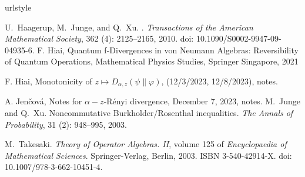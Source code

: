 \documentclass[12pt]{article}
\theoremstyle{definition}
\theoremstyle{remark}
\begin{document}
%
%
\begin{thebibliography}{5}
\providecommand{\natexlab}[1]{#1}
\providecommand{\url}[1]{\texttt{#1}}
\expandafter\ifx\csname urlstyle\endcsname\relax
  \providecommand{\doi}[1]{doi: #1}\else
  \providecommand{\doi}{doi: \begingroup \urlstyle{rm}\Url}\fi


U.~Haagerup, M.~Junge, and Q.~Xu.
.
\newblock \emph{Transactions of the American Mathematical Society},
  362 (4): 2125--2165, 2010.
\newblock \doi{10.1090/S0002-9947-09-04935-6}.
  F. Hiai, Quantum f-Divergences in von Neumann Algebras: Reversibility of Quantum Operations,  Mathematical Physics Studies, Springer Singapore, 2021

 F. Hiai, Monotonicity of $z\mapsto D_{\alpha,z}(\psi\|\varphi)$, 
(12/3/2023, 12/8/2023), notes.

 A. Jen\v cov\'a, Notes for $\alpha-z$-R\'enyi divergence, December 7,
2023, notes.
M.~Junge and Q.~Xu.
\newblock Noncommutative {B}urkholder/{R}osenthal inequalities.
\newblock \emph{The Annals of Probability}, 31 (2): 948--995,
  2003.

M.~Takesaki.
\newblock \emph{Theory of Operator Algebras. {II}}, volume 125 of
  \emph{Encyclopaedia of Mathematical Sciences}.
\newblock Springer-Verlag, Berlin, 2003.
\newblock ISBN 3-540-42914-X.
\newblock \doi{10.1007/978-3-662-10451-4}.


\end{thebibliography}
\end{document}
